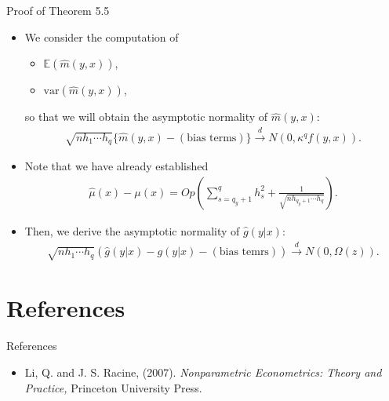 \documentclass[xcolor=svgnames,dvipdfmx,cjk]{beamer}
\theoremstyle{example}
\begin{document}
\begin{frame}{Proof of Theorem 5.5}
  \begin{itemize}
    \item We consider the computation of 
          \begin{itemize}
            \item $\mathbb{E}(\hat{m}(y,x))$,
            \item $\text{var}(\hat{m}(y,x))$,
          \end{itemize}
          so that we will obtain the asymptotic normality of $\hat{m}(y,x)$:
          \begin{align*}
            \sqrt{n h_1 \cdots h_q}
            \{ \hat{m}(y,x) - (\text{bias terms}) \}
            \xrightarrow{d}
            N(0, \kappa^q f(y,x)).
          \end{align*}
    \item Note that we have already established
          \begin{align*}
            \hat{\mu}(x) - \mu(x) 
            = Op \left(
              \sum_{s = q_y +1}^{q} h_s^2 
              +
              \frac{1}{\sqrt{ n h_{q_y+1} \cdots h_q}} 
              \right).
          \end{align*}
    \item Then, we derive the asymptotic normality of $\hat{g}(y|x)$:
          \begin{align*}
            \sqrt{n h_1 \cdots h_q}
            (\hat{g}(y|x) - g(y|x) - (\text{bias temrs}))
            \xrightarrow{d}
            N(0, \Omega(z)).
          \end{align*}
  \end{itemize}
\end{frame}


\section{References}

\begin{frame}{References}
  \begin{itemize}
    \item Li, Q. and J. S. Racine, (2007). 
          \textit{Nonparametric Econometrics: Theory and Practice,} 
          Princeton University Press.
  \end{itemize}
\end{frame}
\end{document}
